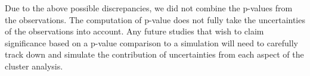 % 



Due to the above possible discrepancies, we did not combine the p-values from
the observations. The computation of p-value does not fully
take the uncertainties of the observations into account. 
Any future studies that wish to claim significance based on a 
p-value comparison to a simulation will 
need to carefully track down and simulate the contribution of uncertainties 
from each aspect of the cluster analysis. 



